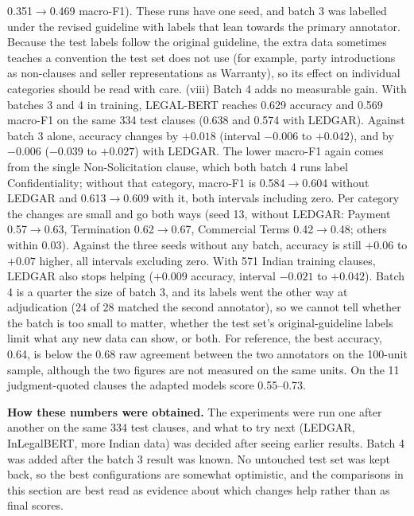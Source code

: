 \documentclass[conference]{IEEEtran}
\begin{document}
0.351$\rightarrow$0.469 macro-F1). These runs have one seed, and batch 3 was labelled under the revised guideline with labels that lean towards the primary annotator. Because the test labels follow the original guideline, the extra data sometimes teaches a convention the test set does not use (for example, party introductions as non-clauses and seller representations as Warranty), so its effect on individual categories should be read with care. (viii) Batch 4 adds no measurable gain. With batches 3 and 4 in training, LEGAL-BERT reaches 0.629 accuracy and 0.569 macro-F1 on the same 334 test clauses (0.638 and 0.574 with LEDGAR). Against batch 3 alone, accuracy changes by $+0.018$ (interval $-0.006$ to $+0.042$), and by $-0.006$ ($-0.039$ to $+0.027$) with LEDGAR. The lower macro-F1 again comes from the single Non-Solicitation clause, which both batch 4 runs label Confidentiality; without that category, macro-F1 is 0.584$\rightarrow$0.604 without LEDGAR and 0.613$\rightarrow$0.609 with it, both intervals including zero. Per category the changes are small and go both ways (seed 13, without LEDGAR: Payment 0.57$\rightarrow$0.63, Termination 0.62$\rightarrow$0.67, Commercial Terms 0.42$\rightarrow$0.48; others within 0.03). Against the three seeds without any batch, accuracy is still $+0.06$ to $+0.07$ higher, all intervals excluding zero. With 571 Indian training clauses, LEDGAR also stops helping ($+0.009$ accuracy, interval $-0.021$ to $+0.042$). Batch 4 is a quarter the size of batch 3, and its labels went the other way at adjudication (24 of 28 matched the second annotator), so we cannot tell whether the batch is too small to matter, whether the test set's original-guideline labels limit what any new data can show, or both. For reference, the best accuracy, 0.64, is below the 0.68 raw agreement between the two annotators on the 100-unit sample, although the two figures are not measured on the same units. On the 11 judgment-quoted clauses the adapted models score 0.55--0.73.

\textbf{How these numbers were obtained.} The experiments were run one after another on the same 334 test clauses, and what to try next (LEDGAR, InLegalBERT, more Indian data) was decided after seeing earlier results. Batch 4 was added after the batch 3 result was known. No untouched test set was kept back, so the best configurations are somewhat optimistic, and the comparisons in this section are best read as evidence about which changes help rather than as final scores.
\end{document}
